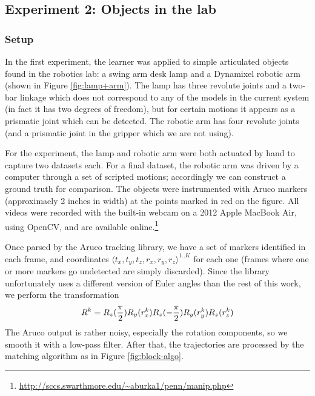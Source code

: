 \documentclass[a4paper,orivec]{llncs}
\def\xmat{\uppercase}    \def\xmatstr{in uppercase}
\begin{document}
\subsection{Experiment 2: Objects in the lab}
\subsubsection{Setup}
In the first experiment, the learner was applied to simple articulated objects found in the robotics lab: a swing arm desk lamp and a Dynamixel robotic arm (shown in Figure \ref{fig:lamp+arm}). The lamp has three revolute joints and a two-bar linkage which does not correspond to any of the models in the current system (in fact it has two degrees of freedom), but for certain motions it appears as a prismatic joint which can be detected. The robotic arm has four revolute joints (and a prismatic joint in the gripper which we are not using).

For the experiment, the lamp and robotic arm were both actuated by hand to capture two datasets each. For a final dataset, the robotic arm was driven by a computer through a set of scripted motions; accordingly we can construct a ground truth for comparison. The objects were instrumented with Aruco markers (approximaely 2 inches in width) at the points marked in red on the figure. All videos were recorded with the built-in webcam on a 2012 Apple MacBook Air, using OpenCV, and are available online.\footnote{\url{http://sccs.swarthmore.edu/~aburka1/penn/manip.php}}

Once parsed by the Aruco tracking library, we have a set of markers identified in each frame, and coordinates $\langle t_x, t_y, t_z, r_x, r_y, r_z \rangle^{1..K}$ for each one (frames where one or more markers go undetected are simply discarded). Since the library unfortunately uses a different version of Euler angles than the rest of this work, we perform the transformation
\begin{align}
  \xmat{r}^k = R_z(\frac{\pi}{2})R_y(r_x^k)R_z(-\frac{\pi}{2})R_y(r_y^k)R_z(r_z^k)
\end{align}
The Aruco output is rather noisy, especially the rotation components, so we smooth it with a low-pass filter. After that, the trajectories are processed by the matching algorithm as in Figure \ref{fig:block-algo}.
\end{document}
